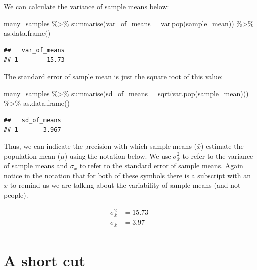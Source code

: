 \documentclass[
]{krantz}
\makeatletter
\newenvironment{Shaded}{\begin{snugshade}}{\end{snugshade}}
\newcommand{\AttributeTok}[1]{\textcolor[rgb]{0.61,0.61,0.61}{#1}}
\newcommand{\FunctionTok}[1]{\textcolor[rgb]{0,0,0}{#1}}
\newcommand{\NormalTok}[1]{#1}
\newcommand{\SpecialCharTok}[1]{\textcolor[rgb]{0,0,0}{#1}}
\newenvironment{kframe}{%
\medskip{}
\setlength{\fboxsep}{.8em}
 \def\at@end@of@kframe{}%
 \ifinner\ifhmode%
  \def\at@end@of@kframe{\end{minipage}}%
  \begin{minipage}{\columnwidth}%
 \fi\fi%
 \def\FrameCommand##1{\hskip\@totalleftmargin \hskip-\fboxsep
 \colorbox{shadecolor}{##1}\hskip-\fboxsep
     \hskip-\linewidth \hskip-\@totalleftmargin \hskip\columnwidth}%
 \MakeFramed {\advance\hsize-\width
   \@totalleftmargin\z@ \linewidth\hsize
   \@setminipage}}%
 {\par\unskip\endMakeFramed%
 \at@end@of@kframe}
\renewenvironment{Shaded}{\begin{kframe}}{\end{kframe}}
\makeatother
\begin{document}
We can calculate the variance of sample means below:

\begin{Shaded}
\begin{Highlighting}[]
\NormalTok{many\_samples }\SpecialCharTok{\%\textgreater{}\%} 
   \FunctionTok{summarise}\NormalTok{(}\AttributeTok{var\_of\_means =} \FunctionTok{var.pop}\NormalTok{(sample\_mean)) }\SpecialCharTok{\%\textgreater{}\%}
   \FunctionTok{as.data.frame}\NormalTok{()}
\end{Highlighting}
\end{Shaded}

\begin{verbatim}
##   var_of_means
## 1        15.73
\end{verbatim}

The standard error of sample mean is just the square root of this value:

\begin{Shaded}
\begin{Highlighting}[]
\NormalTok{many\_samples }\SpecialCharTok{\%\textgreater{}\%} 
   \FunctionTok{summarise}\NormalTok{(}\AttributeTok{sd\_of\_means =} \FunctionTok{sqrt}\NormalTok{(}\FunctionTok{var.pop}\NormalTok{(sample\_mean))) }\SpecialCharTok{\%\textgreater{}\%}
   \FunctionTok{as.data.frame}\NormalTok{()}
\end{Highlighting}
\end{Shaded}

\begin{verbatim}
##   sd_of_means
## 1       3.967
\end{verbatim}

Thus, we can indicate the precision with which sample means (\(\bar{x}\)) estimate the population mean (\(\mu\)) using the notation below. We use \(\sigma_{\bar{x}}^2\) to refer to the variance of sample means and \(\sigma_{\bar{x}}\) to refer to the standard error of sample means. Again notice in the notation that for both of these symbols there is a subscript with an \(\bar{x}\) to remind us we are talking about the variability of sample means (and not people).

\[
\begin{aligned} 
\sigma_{\bar{x}}^2 &= 15.73 \\
\sigma_{\bar{x}} &= 3.97 \\
\end{aligned} 
\]

\hypertarget{a-short-cut}{%
\section{A short cut}\label{a-short-cut}}
\end{document}
